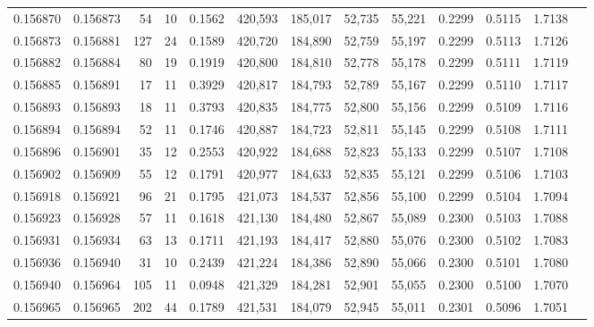 \begin{tabular}{rrrrrrrrrrrrr}
0.156870 & 0.156873 &    54 &  10 &                                     0.1562 & 420,593 & 185,017 &  52,735 &  55,221 & 0.2299 & 0.5115 & 1.7138 \\
0.156873 & 0.156881 &   127 &  24 &                                     0.1589 & 420,720 & 184,890 &  52,759 &  55,197 & 0.2299 & 0.5113 & 1.7126 \\
0.156882 & 0.156884 &    80 &  19 &                                     0.1919 & 420,800 & 184,810 &  52,778 &  55,178 & 0.2299 & 0.5111 & 1.7119 \\
0.156885 & 0.156891 &    17 &  11 &                                     0.3929 & 420,817 & 184,793 &  52,789 &  55,167 & 0.2299 & 0.5110 & 1.7117 \\
0.156893 & 0.156893 &    18 &  11 &                                     0.3793 & 420,835 & 184,775 &  52,800 &  55,156 & 0.2299 & 0.5109 & 1.7116 \\
0.156894 & 0.156894 &    52 &  11 &                                     0.1746 & 420,887 & 184,723 &  52,811 &  55,145 & 0.2299 & 0.5108 & 1.7111 \\
0.156896 & 0.156901 &    35 &  12 &                                     0.2553 & 420,922 & 184,688 &  52,823 &  55,133 & 0.2299 & 0.5107 & 1.7108 \\
0.156902 & 0.156909 &    55 &  12 &                                     0.1791 & 420,977 & 184,633 &  52,835 &  55,121 & 0.2299 & 0.5106 & 1.7103 \\
0.156918 & 0.156921 &    96 &  21 &                                     0.1795 & 421,073 & 184,537 &  52,856 &  55,100 & 0.2299 & 0.5104 & 1.7094 \\
0.156923 & 0.156928 &    57 &  11 &                                     0.1618 & 421,130 & 184,480 &  52,867 &  55,089 & 0.2300 & 0.5103 & 1.7088 \\
0.156931 & 0.156934 &    63 &  13 &                                     0.1711 & 421,193 & 184,417 &  52,880 &  55,076 & 0.2300 & 0.5102 & 1.7083 \\
0.156936 & 0.156940 &    31 &  10 &                                     0.2439 & 421,224 & 184,386 &  52,890 &  55,066 & 0.2300 & 0.5101 & 1.7080 \\
0.156940 & 0.156964 &   105 &  11 &                                     0.0948 & 421,329 & 184,281 &  52,901 &  55,055 & 0.2300 & 0.5100 & 1.7070 \\
0.156965 & 0.156965 &   202 &  44 &                                     0.1789 & 421,531 & 184,079 &  52,945 &  55,011 & 0.2301 & 0.5096 & 1.7051 \\

\end{tabular}
